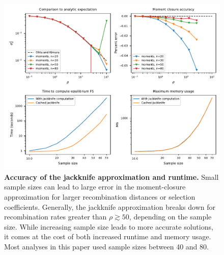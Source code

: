 \documentclass[]{article}
\begin{document}
\begin{figure}[ht!]
    \centering
    \includegraphics{../figures/jackknife}
    \caption{
        \textbf{Accuracy of the jackknife approximation and runtime.}
        Small sample sizes can lead to large error in the moment-closure
        approximation for larger recombination distances or selection
        coefficients. Generally, the jackknife approximation breaks down for
        recombination rates greater than \(\rho\gtrsim50\), depending on
        the sample size. While increasing
        sample size leads to more accurate solutions, it comes at the cost of
        both increased runtime and memory usage. Most analyses in this paper
        used sample sizes between 40 and 80.
    }
    \label{fig:jackknife}
\end{figure}
\end{document}
